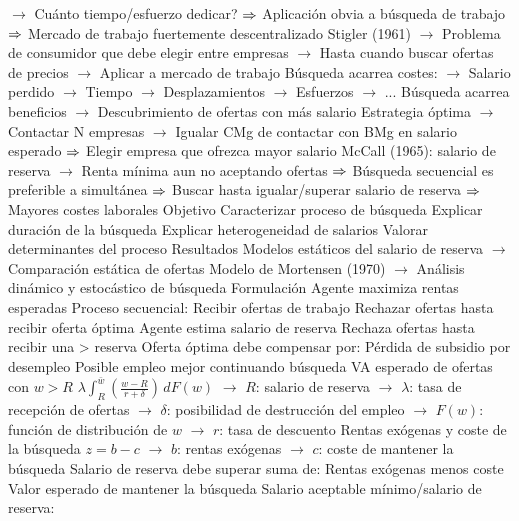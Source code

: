 \documentclass{nuevotema}
\begin{document}
\begin{esquemal}
				\4[] $\to$ Cuánto tiempo/esfuerzo dedicar?
				\4[] $\then$ Aplicación obvia a búsqueda de trabajo
				\4[] $\then$ Mercado de trabajo fuertemente descentralizado
				\4[] Stigler (1961)
				\4[] $\to$ Problema de consumidor que debe elegir entre empresas
				\4[] $\to$ Hasta cuando buscar ofertas de precios
				\4[] $\to$ Aplicar a mercado de trabajo
				\4[] Búsqueda acarrea costes:
				\4[] $\to$ Salario perdido
				\4[] $\to$ Tiempo
				\4[] $\to$ Desplazamientos
				\4[] $\to$ Esfuerzos
				\4[] $\to$ ...
				\4[] Búsqueda acarrea beneficios
				\4[] $\to$ Descubrimiento de ofertas con más salario
				\4[] Estrategia óptima
				\4[] $\to$ Contactar N empresas
				\4[] $\to$ Igualar CMg de contactar con BMg en salario esperado
				\4[] $\then$ Elegir empresa que ofrezca mayor salario
				\4[] McCall (1965): salario de reserva
				\4[] $\to$ Renta mínima aun no aceptando ofertas
				\4[] $\then$ Búsqueda secuencial es preferible a simultánea
				\4[] $\then$ Buscar hasta igualar/superar salario de reserva
				\4[] $\then$ Mayores costes laborales
				\4 Objetivo
				\4[] Caracterizar proceso de búsqueda
				\4[] Explicar duración de la búsqueda
				\4[] Explicar heterogeneidad de salarios
				\4[] Valorar determinantes del proceso
				\4 Resultados
				\4[] Modelos estáticos del salario de reserva
				\4[] $\to$ Comparación estática de ofertas
				\4[] Modelo de Mortensen (1970)
				\4[] $\to$ Análisis dinámico y estocástico de búsqueda
			\3 Formulación
				\4 Agente maximiza rentas esperadas
				\4 Proceso secuencial:
				\4[] Recibir ofertas de trabajo
				\4[] Rechazar ofertas hasta recibir oferta óptima
				\4[$\then$] Agente estima salario de reserva
				\4[$\then$] Rechaza ofertas hasta recibir una > reserva
				\4 Oferta óptima debe compensar por:
				\4[] Pérdida de subsidio por desempleo
				\4[] Posible empleo mejor continuando búsqueda
				\4 VA esperado de ofertas con $w>R$
				\4[] $\lambda \int_R^{\bar{w}} \left( \frac{w - R}{r + \delta} \right) \, d F(w)$
				\4[] $\to$ $R$: salario de reserva
				\4[] $\to$ $\lambda$: tasa de recepción de ofertas
				\4[] $\to$ $\delta$: posibilidad de destrucción del empleo
				\4[] $\to$ $F(w)$: función de distribución de $w$
				\4[] $\to$ $r$: tasa de descuento
				\4 Rentas exógenas y coste de la búsqueda
				\4[] $z=b - c$
				\4[] $\to$ $b$: rentas exógenas
				\4[] $\to$ $c$: coste de mantener la búsqueda
				\4 Salario de reserva debe superar suma de:
				\4[] Rentas exógenas menos coste
				\4[] Valor esperado de mantener la búsqueda
				\4[$\then$] Salario aceptable mínimo/salario de reserva:

\end{esquemal}
\end{document}
